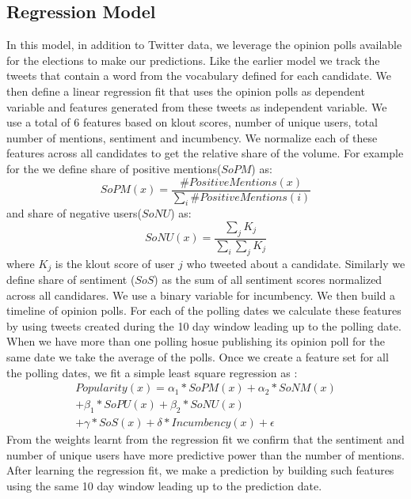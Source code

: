 \subsection{Regression Model}
In this model, in addition to Twitter data, we leverage the opinion polls available for the elections to make our predictions.
Like the earlier model we track the tweets that contain a word from the vocabulary defined for each candidate.
We then define a linear regression fit that uses the opinion polls as dependent variable and features generated from these tweets as independent variable.
We use a total of 6 features based on klout scores, number of unique users, total number of mentions, sentiment and incumbency.
We normalize each of these features across all candidates to get the relative share of the volume. 
For example for the we define share of positive mentions($SoPM$)  as: 
\begin{equation}
SoPM(x) = \frac{\#PositiveMentions(x)}{\sum_i \#PositiveMentions(i)} 
\end{equation}
and share of negative users($SoNU$) as:
\begin{equation}
SoNU(x) = \frac{\sum_j K_j}{\sum_i \sum_j K_j}
\end{equation}
where $K_j$ is the klout score of user $j$ who tweeted about a candidate.
Similarly we define share of sentiment ($SoS$) as the sum of all sentiment scores normalized across all candidares. 
We use a binary variable for incumbency. 
We then build a timeline of opinion polls. 
For each of the polling dates we calculate these features by using tweets created during the 10 day window leading up to the polling date.
When we have more than one polling hosue publishing its opinion poll for the same date we take the average of the polls. 
Once we create a feature set for all the polling dates, we fit a simple least square regression as :
\begin{equation}
\begin{split}
Popularity(x) = \alpha_1 * SoPM(x) + \alpha_2 * SoNM(x) \\
						 + \beta_1 * SoPU(x) + \beta_2 * SoNU(x) \\
						 + \gamma * SoS(x) + \delta * Incumbency(x) + \epsilon
\end{split}
\end{equation}
From the  weights learnt from the regression fit we confirm that the sentiment and number of unique users have more predictive power than the number of mentions.	
After learning the regression fit, we make a prediction by building such features using the same 10 day window leading up to the prediction date.